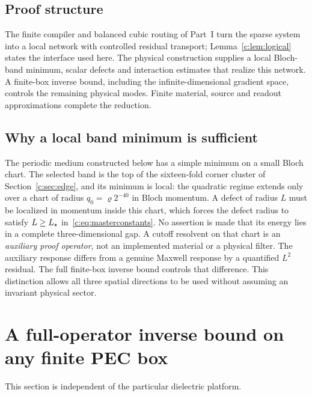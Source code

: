\subsection*{Proof structure}
The finite compiler and balanced cubic routing of Part~I turn the sparse
system into a local network with controlled residual transport;
Lemma~\ref{c:lem:logical} states the interface used here. The physical construction supplies a
local Bloch-band minimum, scalar defects and interaction estimates that
realize this network. A finite-box inverse bound, including the
infinite-dimensional gradient space, controls the remaining physical modes.
Finite material, source and readout approximations complete the reduction.

\subsection*{Why a local band minimum is sufficient}
The periodic medium constructed below has a simple minimum on a small
Bloch chart. The selected band is the top of the sixteen-fold corner
cluster of Section~\ref{c:sec:edge}, and its minimum is local: the
quadratic regime extends only over a chart of radius $q_0=\varrho2^{-40}$
in Bloch momentum. A defect of radius $L$ must be localized in momentum
inside this chart, which forces the defect radius to satisfy
$L\ge L_\star$ in~\eqref{c:eq:masterconstants}. No assertion is made that its energy lies in a complete
three-dimensional gap. A cutoff resolvent on that chart is an
\emph{auxiliary proof operator}, not an implemented material or a physical
filter. The auxiliary response differs from a genuine Maxwell response
by a quantified $L^2$ residual. The full finite-box inverse bound controls
that difference. This distinction allows all three spatial directions to
be used without assuming an invariant physical sector.

\section{A full-operator inverse bound on any finite PEC box}
\label{c:sec:detuning}

This section is independent of the particular dielectric platform.

